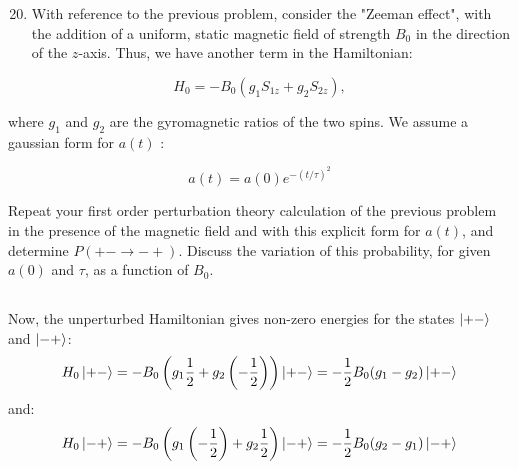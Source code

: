 \documentclass[12pt]{article}
\begin{document}
\section{}
\begin{enumerate}
  \setcounter{enumi}{19}
  \item With reference to the previous problem, consider the "Zeeman effect", with the addition of a uniform, static magnetic field of strength $B_{0}$ in the direction of the $z$-axis. Thus, we have another term in the Hamiltonian:
\end{enumerate}

$$
H_{0}=-B_{0}\left(g_{1} S_{1 z}+g_{2} S_{2 z}\right),
$$

where $g_{1}$ and $g_{2}$ are the gyromagnetic ratios of the two spins. We assume a gaussian form for $a(t)$ :

$$
a(t)=a(0) e^{-(t / \tau)^{2}}
$$

Repeat your first order perturbation theory calculation of the previous problem in the presence of the magnetic field and with this explicit form for $a(t)$, and determine $P(+-\rightarrow-+)$. Discuss the variation of this probability, for given $a(0)$ and $\tau$, as a function of $B_{0}$.
\subsection{}
Now, the unperturbed Hamiltonian gives non-zero energies for the states $\ket{+-}$ and $\ket{-+}$:
\begin{equation}
  H_0\ket{+-} = -B_0\left(g_1\frac{1}{2} + g_2\left(-\frac{1}{2}\right)\right)\ket{+-} = -\frac{1}{2}B_0(g_1 - g_2)\ket{+-}
\end{equation}
and:
\begin{equation}
  H_0\ket{-+} = -B_0\left(g_1\left(-\frac{1}{2}\right) + g_2\frac{1}{2}\right)\ket{-+} = -\frac{1}{2}B_0(g_2 - g_1)\ket{-+}
\end{equation}
\end{document}
